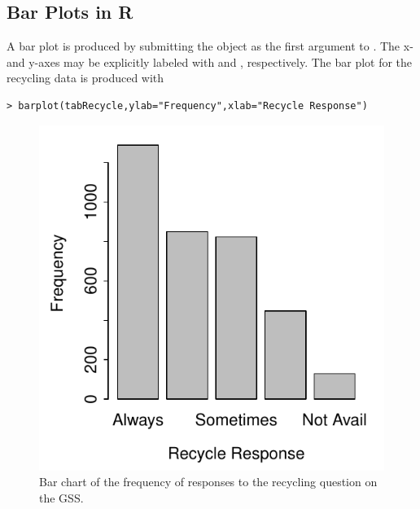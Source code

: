 \documentclass[10pt,openany]{book}\usepackage[]{graphicx}\usepackage[]{color}
\makeatletter
\newenvironment{kframe}{%
 \def\at@end@of@kframe{}%
 \ifinner\ifhmode%
  \def\at@end@of@kframe{\end{minipage}}%
  \begin{minipage}{\columnwidth}%
 \fi\fi%
 \def\FrameCommand##1{\hskip\@totalleftmargin \hskip-\fboxsep
 \colorbox{shadecolor}{##1}\hskip-\fboxsep
     \hskip-\linewidth \hskip-\@totalleftmargin \hskip\columnwidth}%
 \MakeFramed {\advance\hsize-\width
   \@totalleftmargin\z@ \linewidth\hsize
   \@setminipage}}%
 {\par\unskip\endMakeFramed%
 \at@end@of@kframe}
\newenvironment{knitrout}{}{} %
\makeatother
\begin{document}

\subsection{Bar Plots in R} \label{sect:BarChart}
A bar plot is produced by submitting the  object as the first argument to .  The x- and y-axes may be explicitly labeled with  and , respectively.  The bar plot for the recycling data  is produced with

\begin{knitrout}
\color{fgcolor}\begin{kframe}
\begin{verbatim}
> barplot(tabRecycle,ylab="Frequency",xlab="Recycle Response")
\end{verbatim}
\end{kframe}\begin{figure}[hbtp]

{\centering \includegraphics[width=.4\linewidth]{Figs/Barchart1-1} 

}

\caption[Bar chart of the frequency of responses to the recycling question on the GSS]{Bar chart of the frequency of responses to the recycling question on the GSS.}\label{fig:Barchart1}
\end{figure}


\end{knitrout}
\end{document}
